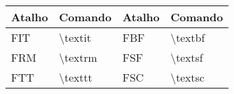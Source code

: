 % 
% 
% 
% 
% 
\begin{tabular}{llll}
    \hline
    Atalho & Comando & Atalho & Comando \\ \hline
    \textsf{FIT} & \textbackslash\textsf{textit} & \textsf{FBF} & \textbackslash\textsf{textbf} \\
    \textsf{FRM} & \textbackslash\textsf{textrm} & \textsf{FSF} & \textbackslash\textsf{textsf} \\
    \textsf{FTT} & \textbackslash\textsf{texttt} & \textsf{FSC} & \textbackslash\textsf{textsc} \\ \hline
\end{tabular}
